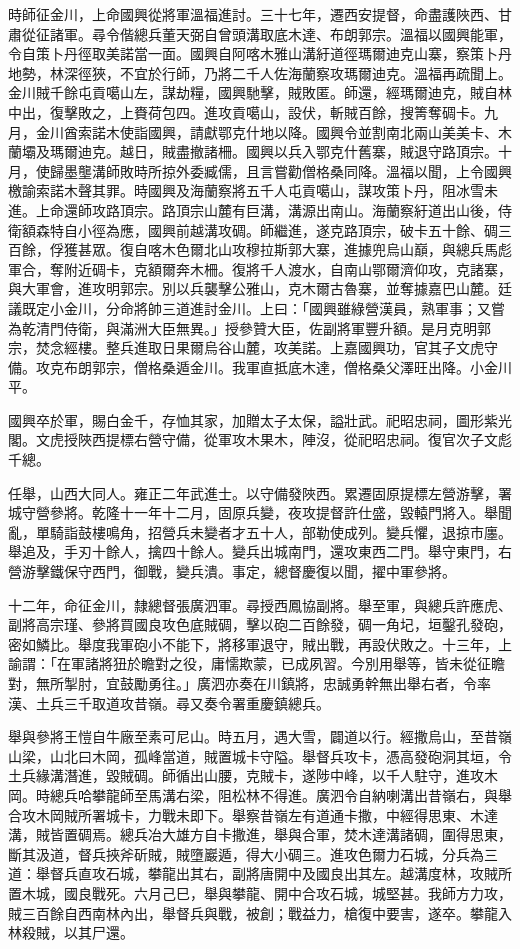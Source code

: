 \begin{pinyinscope}
時師征金川，上命國興從將軍溫福進討。三十七年，遷西安提督，命盡護陜西、甘肅從征諸軍。尋令偕總兵董天弼自曾頭溝取底木達、布朗郭宗。溫福以國興能軍，令自策卜丹徑取美諾當一面。國興自阿喀木雅山溝紆道徑瑪爾迪克山寨，察策卜丹地勢，林深徑狹，不宜於行師，乃將二千人佐海蘭察攻瑪爾迪克。溫福再疏聞上。金川賊千餘屯貢噶山左，謀劫糧，國興馳擊，賊敗匿。師還，經瑪爾迪克，賊自林中出，復擊敗之，上賚荷包四。進攻貢噶山，設伏，斬賊百餘，搜箐奪碉卡。九月，金川酋索諾木使詣國興，請獻鄂克什地以降。國興令並割南北兩山美美卡、木蘭壩及瑪爾迪克。越日，賊盡撤諸柵。國興以兵入鄂克什舊寨，賊退守路頂宗。十月，使歸墨壟溝師敗時所掠外委臧儒，且言嘗勸僧格桑同降。溫福以聞，上令國興檄諭索諾木聲其罪。時國興及海蘭察將五千人屯貢噶山，謀攻策卜丹，阻冰雪未進。上命還師攻路頂宗。路頂宗山麓有巨溝，溝源出南山。海蘭察紆道出山後，侍衛額森特自小徑為應，國興前越溝攻碉。師繼進，遂克路頂宗，破卡五十餘、碉三百餘，俘獲甚眾。復自喀木色爾北山攻穆拉斯郭大寨，進據兜烏山巔，與總兵馬彪軍合，奪附近碉卡，克額爾奔木柵。復將千人渡水，自南山鄂爾濟仰攻，克諸寨，與大軍會，進攻明郭宗。別以兵襲擊公雅山，克木爾古魯寨，並奪據嘉巴山麓。廷議既定小金川，分命將帥三道進討金川。上曰：「國興雖綠營漢員，熟軍事；又嘗為乾清門侍衛，與滿洲大臣無異。」授參贊大臣，佐副將軍豐升額。是月克明郭宗，焚念經樓。整兵進取日果爾烏谷山麓，攻美諾。上嘉國興功，官其子文虎守備。攻克布朗郭宗，僧格桑遁金川。我軍直抵底木達，僧格桑父澤旺出降。小金川平。

國興卒於軍，賜白金千，存恤其家，加贈太子太保，謚壯武。祀昭忠祠，圖形紫光閣。文虎授陜西提標右營守備，從軍攻木果木，陣沒，從祀昭忠祠。復官次子文彪千總。

任舉，山西大同人。雍正二年武進士。以守備發陜西。累遷固原提標左營游擊，署城守營參將。乾隆十一年十二月，固原兵變，夜攻提督許仕盛，毀轅門將入。舉聞亂，單騎詣鼓樓鳴角，招營兵未變者才五十人，部勒使成列。變兵懼，退掠市廛。舉追及，手刃十餘人，擒四十餘人。變兵出城南門，還攻東西二門。舉守東門，右營游擊鐵保守西門，御戰，變兵潰。事定，總督慶復以聞，擢中軍參將。

十二年，命征金川，隸總督張廣泗軍。尋授西鳳協副將。舉至軍，與總兵許應虎、副將高宗瑾、參將買國良攻色底賊碉，擊以砲二百餘發，碉一角圮，垣鑿孔發砲，密如鱗比。舉度我軍砲小不能下，將移軍退守，賊出戰，再設伏敗之。十三年，上諭謂：「在軍諸將狃於瞻對之役，庸懦欺蒙，已成夙習。今別用舉等，皆未從征瞻對，無所掣肘，宜鼓勵勇往。」廣泗亦奏在川鎮將，忠誠勇幹無出舉右者，令率漢、土兵三千取道攻昔嶺。尋又奏令署重慶鎮總兵。

舉與參將王愷自牛廠至素可尼山。時五月，遇大雪，闢道以行。經撒烏山，至昔嶺山梁，山北曰木岡，孤峰當道，賊置城卡守隘。舉督兵攻卡，憑高發砲洞其垣，令土兵緣溝潛進，毀賊碉。師循出山腰，克賊卡，遂陟中峰，以千人駐守，進攻木岡。時總兵哈攀龍師至馬溝右梁，阻松林不得進。廣泗令自納喇溝出昔嶺右，與舉合攻木岡賊所署城卡，力戰未即下。舉察昔嶺左有道通卡撒，中經得思東、木達溝，賊皆置碉焉。總兵冶大雄方自卡撒進，舉與合軍，焚木達溝諸碉，圍得思東，斷其汲道，督兵挾斧斫賊，賊墮巖遁，得大小碉三。進攻色爾力石城，分兵為三道：舉督兵直攻石城，攀龍出其右，副將唐開中及國良出其左。越溝度林，攻賊所置木城，國良戰死。六月己巳，舉與攀龍、開中合攻石城，城堅甚。我師方力攻，賊三百餘自西南林內出，舉督兵與戰，被創；戰益力，槍復中要害，遂卒。攀龍入林殺賊，以其尸還。


\end{pinyinscope}
